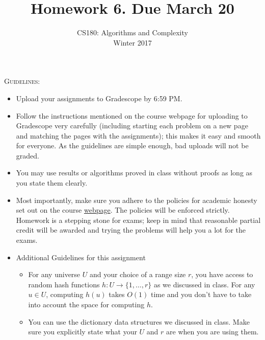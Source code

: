 \documentclass[11pt]{article}
\title{\bf{Homework 6. Due March 20}}
\author{ CS180: Algorithms and Complexity\\Winter 2017}
\date{}
\begin{document}
\maketitle
\begin{mdframed}
\textsc{Guidelines}:
\begin{itemize}
\item Upload your assignments to Gradescope by 6:59 PM. 
\item Follow the instructions mentioned on the course webpage for uploading to Gradescope very carefully (including starting each problem on a new page and matching the pages with the assignments); this makes it easy and smooth for everyone. As the guidelines are simple enough, bad uploads will not be graded. 
\item You may use results or algorithms proved in class without proofs as long as you state them clearly.
\item Most importantly, make sure you adhere to the policies for academic honesty set out on the course \href{http://cs180.raghumeka.org}{webpage}. The policies will be enforced strictly. Homework is a stepping stone for exams; keep in mind that reasonable partial credit will be awarded and trying the problems will help you a lot for the exams.
\item Additional Guidelines for this assignment
\begin{itemize}
\item For any universe $U$ and your choice of a range size $r$, you have access to random hash functions $h: U \to \{1,\ldots,r\}$ as we discussed in class. For any $u \in U$, computing $h(u)$ takes $O(1)$ time and you don't have to take into account the space for computing $h$. 
\item You can use the dictionary data structures we discussed in class. Make sure you explicitly state what your $U$ and $r$ are when you are using them.
\end{itemize}
\end{itemize}
\end{mdframed}
\end{document}
